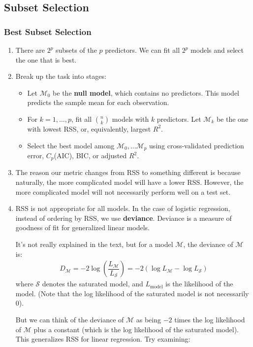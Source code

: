 \documentclass[10pt]{article}
\begin{document}
\subsection{Subset Selection} 
\subsubsection{Best Subset Selection} 
\begin{enumerate}
	\item There are $2^p$ subsets of the $p$ predictors.  We can fit all $2^p$ models and select the one that is best.
	\item Break up the task into stages: \begin{itemize}
		\item Let $\mathcal{M}_0$ be the \textbf{null model}, which contains no predictors.  This model predicts the sample mean for each observation.
		\item For $k = 1, \dots, p$, fit all $ n \choose k $ models with $k$ predictors.  Let $\mathcal{M}_k$ be the one with lowest RSS, or, equivalently, largest $R^2$. 	
		\item Select the best model among $\mathcal{M}_0, \dots \mathcal{M}_p$ using cross-validated prediction error, $C_p$(AIC), BIC, or adjusted $R^2$. 
	\end{itemize}
	\item The reason our metric changes from RSS to something different is because naturally, the more complicated model will have a lower RSS.  However, the more complicated model will not necessarily perform well on a test set.
	\item RSS is not appropriate for all models.  In the case of logistic regression, instead of ordering by RSS, we use \textbf{deviance}. Deviance is a measure of goodness of fit for generalized linear models.  {\color{brown} It's not really explained in the text, but for a model $\mathcal{M}$, the deviance of $\mathcal{M}$ is:
	\begin{align*}
		D_{\mathcal{M}} = -2 \log\left(\dfrac{L_\mathcal{M}}{L_\mathcal{S}}\right) = -2(\log L_\mathcal{M} - \log L_\mathcal{S})
	\end{align*}
	where $\mathcal{S}$ denotes the saturated model, and $L_{\textrm{model}}$ is the likelihood of the model.  (Note that the log likelihood of the saturated model is not necessarily 0). 
	
	But we can think of the deviance of $\mathcal{M}$ as being $-2$ times the log likelihood of $\mathcal{M}$ plus a constant (which is the log likelihood of the saturated model).  This generalizes RSS for linear regression.  Try examining:
	
}
\end{enumerate}
\end{document}
